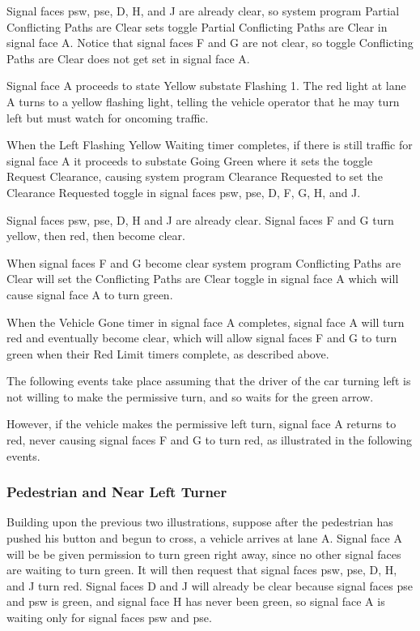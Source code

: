 \documentclass[letterpaper,twoside]{article}
\begin{document}
Signal faces psw, pse, D, H, and J are already clear, so system program Partial
Conflicting Paths are Clear sets toggle Partial Conflicting Paths are Clear
in signal face A.
Notice that signal faces F and G are not clear, so toggle Conflicting Paths
are Clear does not get set in signal face A.

Signal face A proceeds to state Yellow substate Flashing 1.  The red light
at lane A turns to a yellow flashing light, telling the vehicle operator
that he may turn left but must watch for oncoming traffic.

When the Left Flashing Yellow Waiting timer completes, if there is still
traffic for
signal face A it proceeds to substate Going Green where it sets the
toggle Request Clearance, causing system program Clearance Requested to
set the Clearance Requested toggle in signal faces psw, pse, D, F, G, H, and J.

Signal faces psw, pse, D, H and J are already clear.  Signal faces F and G turn
yellow, then red, then become clear.

When signal faces F and G become clear system program Conflicting Paths
are Clear will set the Conflicting Paths are Clear toggle in signal face
A which will cause signal face A to turn green.

When the Vehicle Gone timer in signal face A
completes, signal face A will turn red and eventually become clear,
which will allow signal faces F and G to turn green when their Red Limit
timers complete, as described above.

The following events take place assuming that the driver of the
car turning left is not willing to make the permissive turn,
and so waits for the green arrow.



However, if the vehicle makes the permissive left turn, signal face A
returns to red, never causing signal faces F and G to turn red,
as illustrated in the following events.



\subsubsection{Pedestrian and Near Left Turner}

Building upon the previous two illustrations, suppose after the pedestrian
has pushed his button and begun to cross, a vehicle arrives at lane A.
Signal face A will be be given permission to turn green right away, since no
other signal faces are waiting to turn green.  It will then request
that signal faces psw, pse, D, H, and J turn red.  Signal faces D and J
will already be clear because signal faces pse and psw is green,
and signal face H has never been green, so signal face A is waiting
only for signal faces psw and pse.
\end{document}
